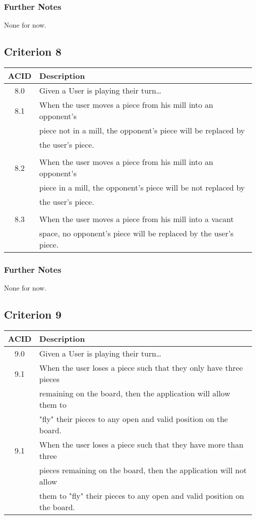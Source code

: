 \documentclass[11pt]{article}
\begin{document}
\subsubsection*{Further Notes}
\label{sec:org825a352}
None for now.

\subsection{Criterion 8}
\label{sec:org8f708c3}
\begin{center}
\begin{tabular}{|c|l|}
ACID & Description\\
\hline
8.0 & Given a User is playing their turn\ldots{}\\
\hline
8.1 & When the user moves a piece from his mill into an opponent's\\
 & piece not in a mill, the opponent's piece will be replaced by\\
 & the user's piece.\\
 & \\
8.2 & When the user moves a piece from his mill into an opponent's\\
 & piece in a mill, the opponent's piece will be not replaced by\\
 & the user's piece.\\
 & \\
8.3 & When the user moves a piece from his mill into a vacant\\
 & space, no opponent's piece will be replaced by the user's piece.\\
\end{tabular}
\end{center}

\subsubsection*{Further Notes}
\label{sec:org48ef585}
None for now.

\subsection{Criterion 9}
\label{sec:orgce0dbe4}
\begin{center}
\begin{tabular}{|c|l|}
ACID & Description\\
\hline
9.0 & Given a User is playing their turn\ldots{}\\
\hline
9.1 & When the user loses a piece such that they only have three pieces\\
 & remaining on the board, then the application will allow them to\\
 & "fly" their pieces to any open and valid position on the board.\\
9.1 & When the user loses a piece such that they have more than three\\
 & pieces remaining on the board, then the application will not allow\\
 & them to "fly" their pieces to any open and valid position on the board.\\
\end{tabular}
\end{center}
\end{document}
